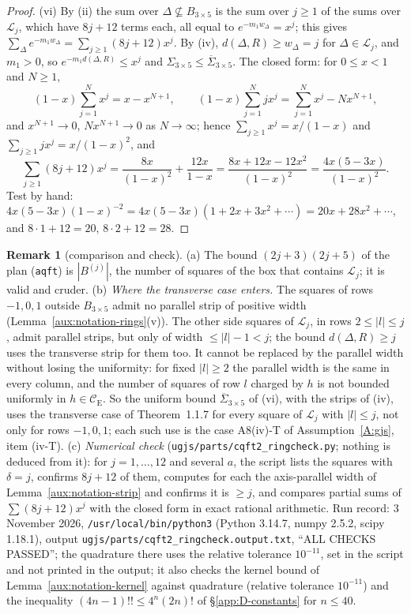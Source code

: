 \documentclass[11pt,a4paper]{article}
\theoremstyle{plain}
\theoremstyle{definition}
\theoremstyle{plain}
\theoremstyle{definition}
\newtheorem{auxrem}[auxlemma]{Remark}
\newcommand{\CE}{\mathcal{C}_{\mathrm E}}
\begin{document}
\begin{proof}
(vi) By (ii) the sum over $\Delta\not\subseteq B_{3\times5}$ is the sum over $j\ge1$ of the
sums over $\mathcal L_j$, which have $8j+12$ terms each, all equal to $e^{-m_1w_\Delta}=x^j$;
this gives $\sum_\Delta e^{-m_1w_\Delta}=\sum_{j\ge1}(8j+12)x^j$.  By (iv), $d(\Delta,R)\ge
w_\Delta=j$ for $\Delta\in\mathcal L_j$, and $m_1>0$, so $e^{-m_1d(\Delta,R)}\le x^j$ and
$\Sigma_{3\times5}\le\overline\Sigma_{3\times5}$.  The closed form: for $0\le x<1$ and $N\ge1$,
\[
 (1-x)\sum_{j=1}^Nx^j=x-x^{N+1},\qquad
 (1-x)\sum_{j=1}^Njx^j=\sum_{j=1}^Nx^j-Nx^{N+1},
\]
and $x^{N+1}\to0$, $Nx^{N+1}\to0$ as $N\to\infty$; hence $\sum_{j\ge1}x^j=x/(1-x)$ and
$\sum_{j\ge1}jx^j=x/(1-x)^2$, and
\[
 \sum_{j\ge1}(8j+12)x^j=\frac{8x}{(1-x)^2}+\frac{12x}{1-x}
 =\frac{8x+12x-12x^2}{(1-x)^2}=\frac{4x(5-3x)}{(1-x)^2} .
\]
Test by hand: $4x(5-3x)(1-x)^{-2}=4x(5-3x)(1+2x+3x^2+\cdots)=20x+28x^2+\cdots$, and
$8\cdot1+12=20$, $8\cdot2+12=28$.
\end{proof}

\begin{auxrem}[comparison and check]\label{aux:notation-ringrem}
(a) The bound $(2j+3)(2j+5)$ of the plan (\texttt{aqft}) is $|B^{(j)}|$, the number of
squares of the box that contains $\mathcal L_j$; it is valid and cruder.
(b) \emph{Where the transverse case enters.}  The squares of rows $-1,0,1$ outside
$B_{3\times5}$ admit no parallel strip of positive width
(Lemma~\ref{aux:notation-rings}(v)).  The other side squares of $\mathcal L_j$, in rows
$2\le|l|\le j$, admit parallel strips, but only of width $\le|l|-1<j$; the bound
$d(\Delta,R)\ge j$ uses the transverse strip for them too.  It cannot be replaced by the
parallel width without losing the uniformity: for fixed $|l|\ge2$ the parallel width is the
same in every column, and the number of squares of row $l$ charged by $h$ is not bounded
uniformly in $h\in\CE$.  So the uniform bound $\overline\Sigma_{3\times5}$ of (vi), with the
strips of (iv), uses the transverse case of Theorem~1.1.7
for every square of $\mathcal L_j$ with $|l|\le j$, not only for rows $-1,0,1$; each such
use is the case A8(iv)-T of Assumption~\ref{A:gjs}, item (iv-T).
(c) \emph{Numerical check} (\texttt{ugjs/parts/cqft2\_ringcheck.py}; nothing is deduced from
it): for $j=1,\dots,12$ and several $a$, the script lists the squares with $\delta=j$,
confirms $8j+12$ of them, computes for each the axis-parallel width of
Lemma~\ref{aux:notation-strip} and confirms it is $\ge j$, and compares partial sums of
$\sum(8j+12)x^j$ with the closed form in exact rational arithmetic.  Run record: 3 November 2026,
\texttt{/usr/local/bin/python3} (Python 3.14.7, numpy 2.5.2, scipy 1.18.1), output
\texttt{ugjs/parts/cqft2\_ringcheck.output.txt}, ``ALL CHECKS PASSED''; the quadrature there uses
the relative tolerance $10^{-11}$, set in the script and not printed in the output; it also checks the kernel
bound of Lemma~\ref{aux:notation-kernel} against quadrature (relative tolerance $10^{-11}$) and
the inequality $(4n-1)!!\le4^n(2n)!$ of \S\ref{app:D-constants} for $n\le40$.
\end{auxrem}
\end{document}
